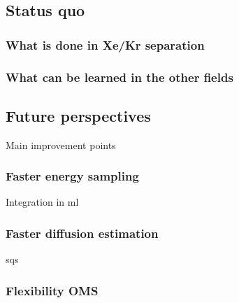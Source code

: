 \documentclass[main]{subfiles}
\begin{document}
\subsection{Status quo}

\subsubsection{What is done in Xe/Kr separation}

\subsubsection{What can be learned in the other fields}

\subsection{Future perspectives}

Main improvement points

\subsubsection{Faster energy sampling}
Integration in ml
\subsubsection{Faster diffusion estimation}
sqs
\subsubsection{Flexibility OMS}

\OnlyInSubfile{\printglobalbibliography}
\end{document}

